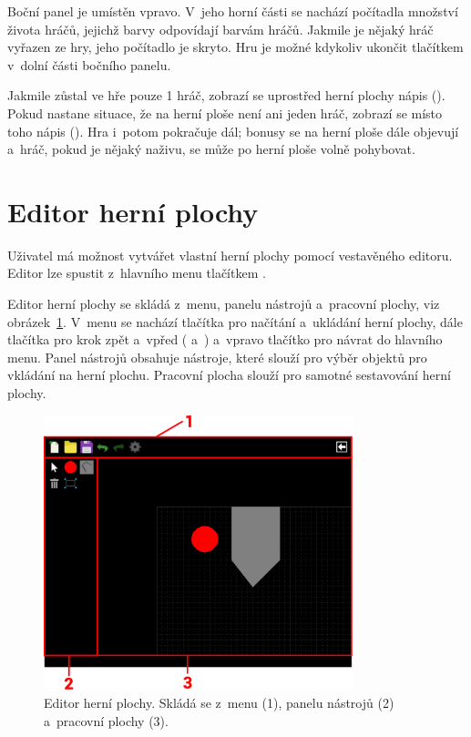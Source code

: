 Boční panel je umístěn vpravo. V~jeho horní části se nachází počítadla množství života hráčů, jejichž barvy odpovídají barvám hráčů. Jakmile je nějaký hráč vyřazen ze hry, jeho počítadlo je skryto. Hru je možné kdykoliv ukončit tlačítkem  v~dolní části bočního panelu.

Jakmile zůstal ve hře pouze 1 hráč, zobrazí se uprostřed herní plochy nápis  (). Pokud nastane situace, že na herní ploše není ani jeden hráč, zobrazí se místo toho nápis  (). Hra i~potom pokračuje dál; bonusy se na herní ploše dále objevují a~hráč, pokud je nějaký naživu, se může po herní ploše volně pohybovat.

\section{Editor herní plochy}
\label{sec:editor-herni-plochy}

Uživatel má možnost vytvářet vlastní herní plochy pomocí vestavěného editoru. Editor lze spustit z~hlavního menu tlačítkem .

Editor herní plochy se skládá z~menu, panelu nástrojů a~pracovní plochy, viz obrázek~\ref{fig:stage-editor}. V~menu se nachází tlačítka pro načítání a~ukládání herní plochy, dále tlačítka pro krok zpět a~vpřed ( a~) a~vpravo tlačítko pro návrat do hlavního menu. Panel nástrojů obsahuje nástroje, které slouží pro výběr objektů pro vkládání na herní plochu. Pracovní plocha slouží pro samotné sestavování herní plochy.

\begin{figure}[ht]
    \centering
    \includegraphics[width=0.8\textwidth]{doc/obrazky-figures/stage-editor.pdf}
    \caption{Editor herní plochy. Skládá se z~menu (1), panelu nástrojů (2) a~pracovní plochy (3).}
    \label{fig:stage-editor}
\end{figure}

